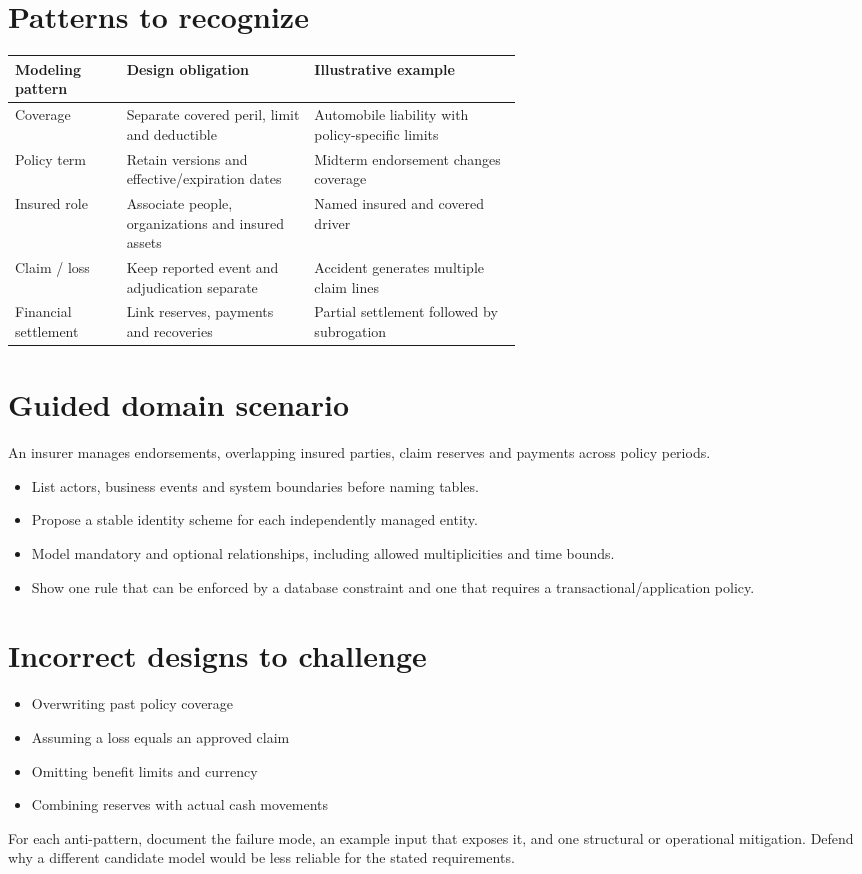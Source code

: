 \documentclass[11pt,letterpaper]{article}
\begin{document}
\section{Patterns to recognize}
\begin{tabularx}{\linewidth}{@{}>{\raggedright\arraybackslash}p{0.22\linewidth} >{\raggedright\arraybackslash}p{0.37\linewidth}>{\raggedright\arraybackslash}X@{}}
\toprule
\textbf{Modeling pattern} & \textbf{Design obligation} & \textbf{Illustrative example} \\ 
\midrule
Coverage & Separate covered peril, limit and deductible & Automobile liability with policy-specific limits \\ 
Policy term & Retain versions and effective/expiration dates & Midterm endorsement changes coverage \\ 
Insured role & Associate people, organizations and insured assets & Named insured and covered driver \\ 
Claim / loss & Keep reported event and adjudication separate & Accident generates multiple claim lines \\ 
Financial settlement & Link reserves, payments and recoveries & Partial settlement followed by subrogation \\ 
\bottomrule
\end{tabularx}

\section{Guided domain scenario}
An insurer manages endorsements, overlapping insured parties, claim reserves and payments across policy periods.

\begin{itemize}
\item List actors, business events and system boundaries before naming tables.
\item Propose a stable identity scheme for each independently managed entity.
\item Model mandatory and optional relationships, including allowed multiplicities and time bounds.
\item Show one rule that can be enforced by a database constraint and one that requires a transactional/application policy.
\end{itemize}

\section{Incorrect designs to challenge}
\begin{itemize}
\item Overwriting past policy coverage
\item Assuming a loss equals an approved claim
\item Omitting benefit limits and currency
\item Combining reserves with actual cash movements
\end{itemize}
For each anti-pattern, document the failure mode, an example input that exposes it, and one structural or operational mitigation. Defend why a different candidate model would be less reliable for the stated requirements.
\end{document}
